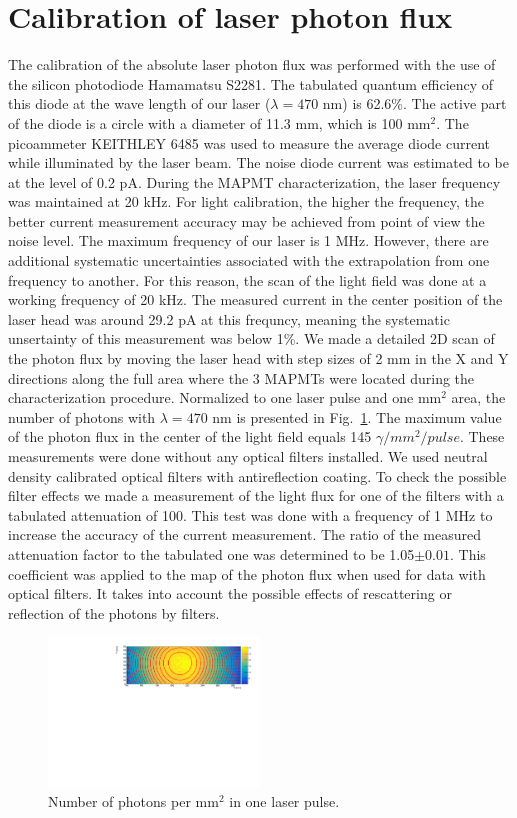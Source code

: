 \section{Calibration of laser photon flux}

The calibration of the absolute laser photon flux was performed with the use of the silicon photodiode  Hamamatsu S2281.
The tabulated quantum efficiency of this diode at the wave length of our laser ($\lambda=470$ nm) is 62.6\%. 
The active part of the diode is a circle with a diameter of 11.3 mm, which is 100 mm$^2$. 
The picoammeter KEITHLEY 6485 was used to measure the average diode current while illuminated by the laser beam.
The noise diode current was estimated to be at the level of 0.2 pA. 
During the MAPMT characterization, the laser frequency was maintained at 20 kHz. 
For light calibration, the higher the frequency, the better current measurement accuracy may be achieved from point of view the noise level. 
The maximum frequency of our laser is 1 MHz.
However, there are additional systematic uncertainties associated with the extrapolation from one frequency to another. 
For this reason, the scan of the light field was done at a working frequency of 20 kHz. 
The measured current in the center position of the laser head was around 29.2 pA at this frequncy, meaning the systematic unsertainty
of this measurement was below 1\%.  We made a detailed 2D scan of the photon flux by
moving the laser head with step sizes of 2 mm in the X and Y directions along the full area where the 3 MAPMTs were located during the characterization procedure.
Normalized to one laser pulse and one mm$^2$ area, the number of photons with $\lambda=470$ nm  is presented in Fig.~\ref{fig:light_flux}.
The maximum value of the photon flux in the center of the light field equals 145 $\gamma/mm^2/pulse$.
These measurements were done without  any optical filters installed. We used neutral density calibrated optical filters with antireflection coating.
To check the possible filter effects we made a measurement of the light flux for one of the filters with a tabulated attenuation of 100. 
This test was done with a frequency of 1 MHz to increase the accuracy of the current measurement. 
The ratio of the measured attenuation factor to the tabulated one was determined to be 1.05$\pm 0.01$. This coefficient was applied to the map of the photon flux when used for data with optical filters. It takes into account the possible effects of rescattering or reflection of the photons by filters.
\begin{figure}[h]
\centering
\includegraphics[width=0.5\textwidth]{figures/photon_flux.pdf}
\caption{Number of photons per mm$^2$ in  one laser pulse.}
\label{fig:light_flux}
\end{figure}

